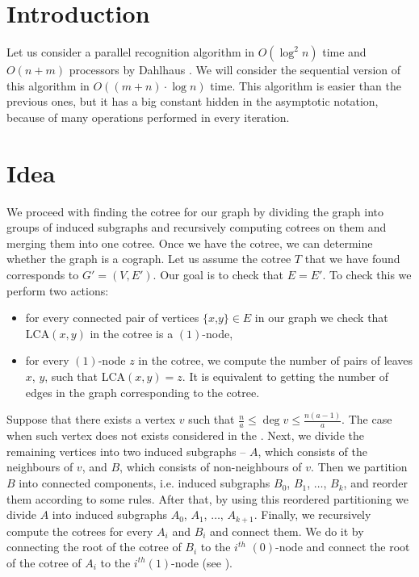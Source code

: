 \section{Introduction}
Let us consider a parallel recognition algorithm in $O(\log^2{n})$ time and 
$O(n + m)$ processors by Dahlhaus \cite{dahlhaus_95}. 
We will consider the sequential version of this algorithm in $O((m + n) \cdot \log{n})$ time.
This algorithm is easier than the previous ones, but it has a big constant hidden in the asymptotic notation, because of many operations performed in every iteration.

\section{Idea}
We proceed with finding the cotree for our graph by dividing the graph into groups of induced subgraphs and recursively computing cotrees on them and merging them into one cotree. Once we have the cotree, we can determine whether the graph is a cograph. Let us assume the cotree $T$ that we have found corresponds to $G'=(V, E')$. Our goal is to check that $E = E'$. To check this we perform two actions:
\begin{itemize}
    \item for every connected pair of vertices $\{x$,$y\} \in E$ in our graph we check that LCA$(x,y)$ in the cotree is a $(1)$-node,
    \item for every $(1)$-node $z$ in the cotree, we compute the number of pairs of leaves $x$, $y$, such that LCA$(x,y) = z$. It is equivalent to getting the number of edges in the graph corresponding to the cotree.
\end{itemize}

Suppose that there exists a vertex $v$ such that $\frac{n}{a} \leq \deg{v} \leq \frac{n(a - 1)} {a}$. The case when such vertex does not exists considered in the . Next, we divide the remaining vertices into two induced subgraphs -- $A$, which consists of the neighbours of $v$, and $B$, which consists of non-neighbours of $v$. Then we partition $B$ into connected components, i.e. induced subgraphs $B_0$, $B_1$, $\ldots$, $B_k$, and reorder them according to some rules. After that, by using this reordered partitioning we divide $A$ into induced subgraphs $A_0$, $A_1$, $\ldots$, $A_{k+1}$. Finally, we recursively compute the cotrees for every $A_i$ and $B_i$ and connect them. We do it by connecting the root of the cotree of $B_i$ to the $i^{th}$ $(0)$-node and connect the root of the cotree of $A_i$ to the $i^{th} (1)$-node (see ).

